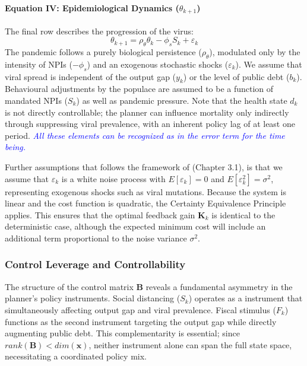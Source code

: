 \paragraph{Equation IV: Epidemiological Dynamics ($\theta_{k+1}$)}The final row describes the progression of the virus:\begin{equation}\theta_{k+1} = \rho_\theta \theta_k - \phi_s S_k + \varepsilon_k\end{equation}The pandemic follows a purely biological persistence ($\rho_\theta$), modulated only by the intensity of NPIs ($-\phi_s$) and an exogenous stochastic shocks ($\varepsilon_k$). We assume that viral spread is independent of the output gap ($y_k$) or the level of public debt ($b_k$). Behavioural adjustments by the populace are assumed to be a function of mandated NPIs ($S_k$) as well as pandemic pressure. Note that the health state $d_k$ is not directly controllable; the planner can influence mortality only indirectly through suppressing 
viral prevalence, with an inherent policy lag of at least one period. \textit{ \textcolor{blue}{All these elements can be recognized as in the error term for the time being.}}

\vspace{4mm}

\noindent Further assumptions that follows the framework of \cite{bertsekas2017dynamic} (Chapter 3.1), is that we assume that $\varepsilon_k$ is a white noise process with $E[\varepsilon_k] = 0$ and $E[\varepsilon_k^2] = \sigma^2$, representing exogenous shocks such as viral mutations. Because the system is linear and the cost function is quadratic, the Certainty Equivalence Principle applies. This ensures that the optimal feedback gain $\bm{K}_k$ is identical to the deterministic case, although the expected minimum cost will include an additional term proportional to the noise variance $\sigma^2$.



\subsubsection{Control Leverage and Controllability}


The structure of the control matrix $\bm{B}$ reveals a fundamental asymmetry in the planner's policy instruments. Social distancing ($S_k$) operates as a instrument that simultaneously affecting output gap and viral prevalence. Fiscal stimulus ($F_k$) functions as the second instrument targeting the output gap while directly augmenting public debt. This complementarity is essential; since $rank(\bm{B}) < dim(\bm{x})$, neither instrument alone can span the full state space, necessitating a coordinated policy mix. 

